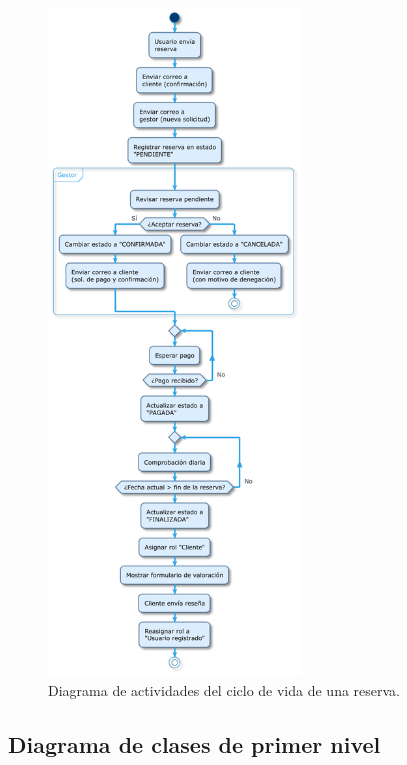 \begin{figure}[h!tb]
    \centering
    \includegraphics[width=0.6\textwidth]{figs/actividades.pdf}
    \caption{Diagrama de actividades del ciclo de vida de una reserva.}
    \label{fig:diagrama_actividades}
\end{figure}



\subsection{Diagrama de clases de primer nivel}


